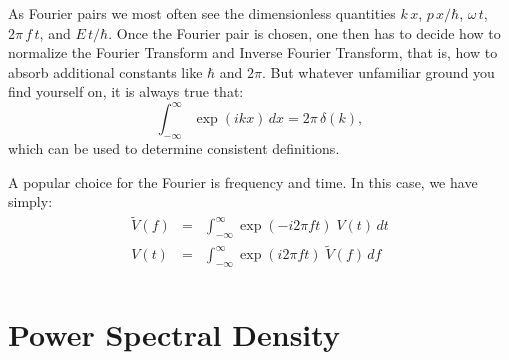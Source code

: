 \documentclass[12pt,oneside]{book}
\begin{document}
As Fourier pairs we most often see the dimensionless quantities $k\,x$, $p\,x/\hbar$, $\omega \, t$, $2\pi \, f \, t$, and $E \, t/\hbar$.  Once the Fourier pair is chosen, one then has to decide how to normalize the Fourier Transform and Inverse Fourier Transform, that is, how to absorb additional constants like $\hbar$ and $2 \pi$.  But whatever unfamiliar ground you find yourself on, it is always true that:
\begin{displaymath}
\int^{\infty}_{-\infty} \exp(ikx) \, dx = 2\pi \, \delta(k),
\end{displaymath}
which can be used to determine consistent definitions.

A popular choice for the Fourier is frequency and time.  In this case, we have simply:
\begin{eqnarray}
\widetilde{V}(f) &=& \int^{\infty}_{-\infty}\exp(-i2\pi f t) \; V(t) \, dt \\
V(t) &=& \int^{\infty}_{-\infty}\exp(i2\pi f t) \; \widetilde{V}(f) \, df \\
\end{eqnarray}

\chapter{Power Spectral Density}
\end{document}
